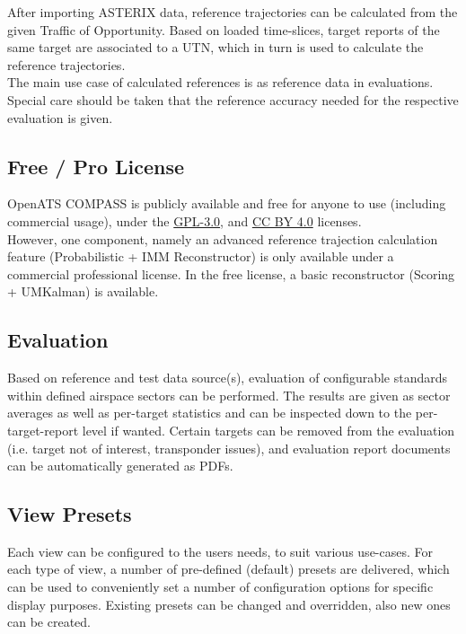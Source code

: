 After importing ASTERIX data, reference trajectories can be calculated from the given Traffic of Opportunity. Based on loaded time-slices, target reports of the same target are associated to a UTN, which in turn is used to calculate the reference trajectories. \\

The main use case of calculated references is as reference data in evaluations. Special care should be taken that the reference accuracy needed for the respective evaluation is given. \\

\subsection*{Free / Pro License}

OpenATS COMPASS is publicly available and free for anyone to use (including commercial usage), under the \href{https://www.gnu.org/licenses/gpl-3.0.en.html}{GPL-3.0}, and \href{https://creativecommons.org/licenses/by/4.0/}{CC BY 4.0} licenses. \\

However, one component, namely an advanced reference trajection calculation feature (Probabilistic + IMM Reconstructor) is only available under a commercial professional license. In the free license, a basic reconstructor (Scoring + UMKalman) is available.

\subsection*{Evaluation}

Based on reference and test data source(s), evaluation of configurable standards within defined airspace sectors can be performed. The results are given as sector averages as well as per-target statistics and can be inspected down to the per-target-report level if wanted. Certain targets can be removed from the evaluation (i.e. target not of interest, transponder issues), and evaluation report documents can be automatically generated as PDFs.

\subsection*{View Presets}

Each view can be configured to the users needs, to suit various use-cases. For each type of view, a number of pre-defined (default) presets are delivered, which can be used to conveniently set a number of configuration options for specific display purposes. Existing presets can be changed and overridden, also new ones can be created.

